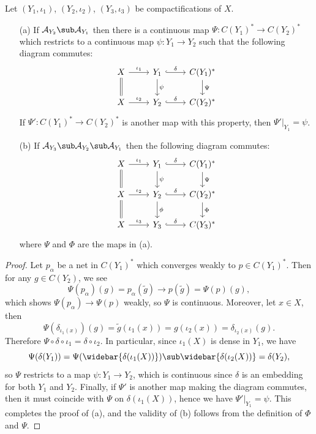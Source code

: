 \begin{proposition}\label{compactification morphism if algebra inclusion}
Let $(Y_1,\iota_1)$, $(Y_2,\iota_2)$, $(Y_3,\iota_3)$ be compactifications of $X$.
\begin{itemize}
\item[(a)] If $\mathcal{A}_{Y_2}\sub\mathcal{A}_{Y_1}$ then there is a continuous map $\Psi:C(Y_1)^*\to C(Y_2)^*$ which restricts to a continuous map $\psi:Y_1\to Y_2$ such that the following diagram commutes:
\[\begin{tikzcd}
X\ar[r,"\iota_1"]\ar[d,equal]&Y_1\ar[r,hook,"\delta"]\ar[d,"\psi"]&C(Y_1)^*\ar[d,"\Psi"]\\
X\ar[r,"\iota_2"]&Y_2\ar[r,hook,"\delta"]&C(Y_2)^*
\end{tikzcd}\]
If $\Psi':C(Y_1)^*\to C(Y_2)^*$ is another map with this property, then $\Psi'|_{Y_1}=\psi$.
\item[(b)] If $\mathcal{A}_{Y_3}\sub\mathcal{A}_{Y_2}\sub\mathcal{A}_{Y_1}$ then the following diagram commutes:
\[\begin{tikzcd}
X\ar[r,"\iota_1"]\ar[d,equal]&Y_1\ar[r,hook,"\delta"]\ar[d,"\psi"]&C(Y_1)^*\ar[d,"\Psi"]\\
X\ar[r,"\iota_2"]\ar[d,equal]&Y_2\ar[r,hook,"\delta"]\ar[d,"\phi"]&C(Y_2)^*\ar[d,"\Phi"]\\
X\ar[r,"\iota_3"]&Y_3\ar[r,hook,"\delta"]&C(Y_3)^*
\end{tikzcd}\]
where $\Psi$ and $\Phi$ are the maps in (a).
\end{itemize}
\end{proposition}
\begin{proof}
Let $p_\alpha$ be a net in $C(Y_1)^*$ which converges weakly to $p\in C(Y_1)^*$. Then for any $g\in C(Y_2)$, we see
\[\Psi(p_\alpha)(g)=p_\alpha(\tilde{g})\to p(\tilde{g})=\Psi(p)(g),\]
which shows $\Psi(p_\alpha)\to\Psi(p)$ weakly, so $\Psi$ is continuous. Moreover, let $x\in X$, then
\[\Psi(\delta_{\iota_1(x)})(g)=\tilde{g}(\iota_1(x))=g(\iota_2(x))=\delta_{\iota_2(x)}(g).\]
Therefore $\Psi\circ\delta\circ\iota_1=\delta\circ\iota_2$. In particular, since $\iota_1(X)$ is dense in $Y_1$, we have
\[\Psi(\delta(Y_1))=\Psi(\widebar{\delta(\iota_1(X))})\sub\widebar{\delta(\iota_2(X))}=\delta(Y_2),\]
so $\Psi$ restricts to a map $\psi:Y_1\to Y_2$, which is continuous since $\delta$ is an embedding for both $Y_1$ and $Y_2$. Finally, if $\Psi'$ is another map making the diagram commutes, then it must coincide with $\Psi$ on $\delta(\iota_1(X))$, hence we have $\Psi'|_{Y_1}=\psi$. This completes the proof of (a), and the validity of (b) follows from the definition of $\Phi$ and $\Psi$.
\end{proof}
